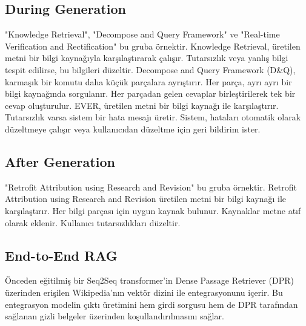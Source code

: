 \subsection{During Generation}
"Knowledge Retrieval", "Decompose and Query Framework" ve "Real-time Verification and Rectification" bu gruba örnektir. Knowledge Retrieval, üretilen metni bir bilgi kaynağıyla karşılaştırarak çalışır. Tutarsızlık veya yanlış bilgi tespit edilirse, bu bilgileri düzeltir. Decompose and Query Framework (D\&Q), karmaşık bir komutu daha küçük parçalara ayrıştırır. Her parça, ayrı ayrı bir bilgi kaynağında sorgulanır. Her parçadan gelen cevaplar birleştirilerek tek bir cevap oluşturulur. EVER, üretilen metni bir bilgi kaynağı ile karşılaştırır. Tutarsızlık varsa sistem bir hata mesajı üretir. Sistem, hataları otomatik olarak düzeltmeye çalışır veya kullanıcıdan düzeltme için geri bildirim ister.

\subsection{After Generation}
"Retrofit Attribution using Research and Revision" bu gruba örnektir. Retrofit Attribution using Research and Revision üretilen metni bir bilgi kaynağı ile karşılaştırır. Her bilgi parçası için uygun kaynak bulunur. Kaynaklar metne atıf olarak eklenir. Kullanıcı tutarsızlıkları düzeltir.

\subsection{End-to-End RAG}
Önceden eğitilmiş bir Seq2Seq transformer'in Dense Passage Retriever (DPR) üzerinden erişilen Wikipedia'nın vektör dizini ile entegrasyonunu içerir. Bu entegrasyon modelin çıktı üretimini hem girdi sorgusu hem de DPR tarafından sağlanan gizli belgeler üzerinden koşullandırılmasını sağlar.

\newpage